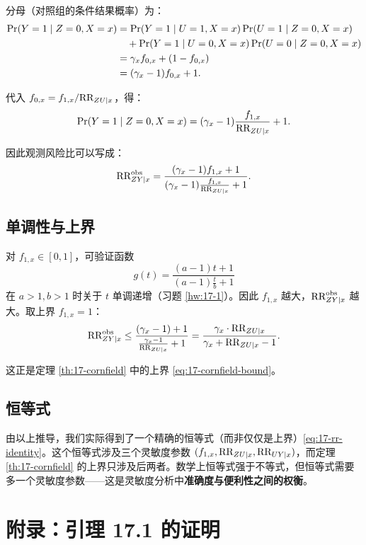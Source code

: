 分母（对照组的条件结果概率）为：
\[
\begin{aligned}
\operatorname{Pr}(Y=1 \mid Z=0, X=x)
&= \operatorname{Pr}(Y=1 \mid U=1, X=x) \operatorname{Pr}(U=1 \mid Z=0, X=x) \\
&\quad + \operatorname{Pr}(Y=1 \mid U=0, X=x) \operatorname{Pr}(U=0 \mid Z=0, X=x) \\
&= \gamma_x f_{0,x} + (1 - f_{0,x}) \\
&= (\gamma_x - 1) f_{0,x} + 1 .
\end{aligned}
\]

代入 $f_{0,x} = f_{1,x} / \text{RR}_{ZU\mid x}$，得：
\[
\operatorname{Pr}(Y=1 \mid Z=0, X=x) = (\gamma_x - 1) \frac{f_{1,x}}{\text{RR}_{ZU\mid x}} + 1 .
\]

因此观测风险比可以写成：
\begin{equation}
\text{RR}_{ZY\mid x}^{\mathrm{obs}} = \frac{(\gamma_x - 1) f_{1,x} + 1}{(\gamma_x - 1) \frac{f_{1,x}}{\text{RR}_{ZU\mid x}} + 1} .
\label{eq:17-rr-identity}
\end{equation}

\section{单调性与上界}\label{sec:appendix-17-proof-monotonicity}

对 $f_{1,x} \in [0,1]$，可验证函数
\[
g(t) = \frac{(a-1)t + 1}{(a-1)\frac{t}{b} + 1}
\]
在 $a > 1, b > 1$ 时关于 $t$ 单调递增（习题 \ref{hw:17-1}）。因此 $f_{1,x}$ 越大，$\text{RR}_{ZY\mid x}^{\mathrm{obs}}$ 越大。取上界 $f_{1,x} = 1$：
\[
\text{RR}_{ZY\mid x}^{\mathrm{obs}} \leq \frac{(\gamma_x - 1) + 1}{\frac{\gamma_x - 1}{\text{RR}_{ZU\mid x}} + 1} = \frac{\gamma_x \cdot \text{RR}_{ZU\mid x}}{\gamma_x + \text{RR}_{ZU\mid x} - 1} .
\]

这正是定理 \ref{th:17-cornfield} 中的上界 \cref{eq:17-cornfield-bound}。

\section{恒等式}\label{sec:appendix-17-identity}

由以上推导，我们实际得到了一个精确的恒等式（而非仅仅是上界）\cref{eq:17-rr-identity}。这个恒等式涉及三个灵敏度参数 $(f_{1,x}, \text{RR}_{ZU\mid x}, \text{RR}_{UY\mid x})$，而定理 \ref{th:17-cornfield} 的上界只涉及后两者。数学上恒等式强于不等式，但恒等式需要多一个灵敏度参数——这是灵敏度分析中\textbf{准确度与便利性之间的权衡}。

\chapter{附录：引理 17.1 的证明}\label{sec:appendix-17-lemma-proof}

